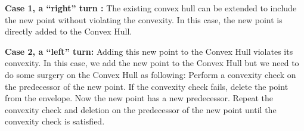 \documentclass{article}
\begin{document}
\textbf{Case 1, a ``right'' turn :}  The existing convex hull can be extended to include the new point without violating the convexity. In this case, the new point is directly added to the Convex Hull.


\textbf{Case 2, a ``left'' turn:} Adding this new point to the Convex Hull violates its convexity. In this case, we add the new point to the Convex Hull but we need to do some surgery on the Convex Hull as following: Perform a convexity check on the predecessor of the new point. If the convexity check fails, delete the
point from the envelope.  Now the new point has a new predecessor. Repeat the convexity check and deletion on the predecessor of the new point until the
convexity check is satisfied.


\end{document}
